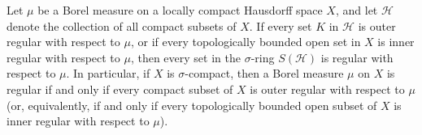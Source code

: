 Let $\mu$ be a Borel measure on a locally compact Hausdorff space $X$, and let $\mathcal{H}$ denote the collection of all compact subsets of $X$. If every set $K$ in $\mathcal{H}$ is outer regular with respect to $\mu$, or if every topologically bounded open set in $X$ is inner regular with respect to $\mu$, then every set in the $\sigma$-ring $S(\mathcal{H})$ is regular with respect to $\mu$. In particular, if $X$ is $\sigma$-compact, then a Borel measure $\mu$ on $X$ is regular if and only if every compact subset of $X$ is outer regular with respect to $\mu$ (or, equivalently, if and only if every topologically bounded open subset of $X$ is inner regular with respect to $\mu$).
